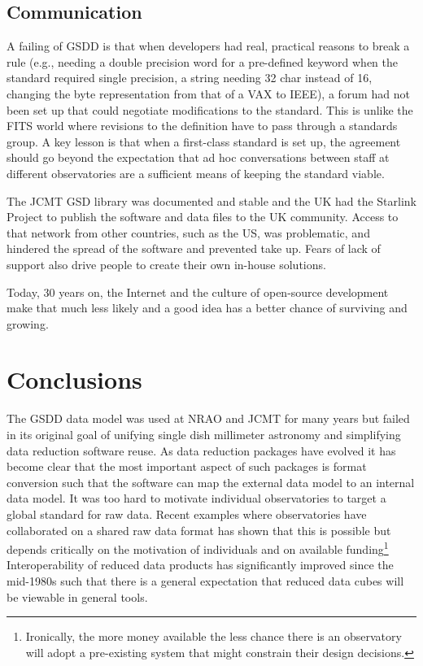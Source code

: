 \documentclass[final,authoryear,5p,times,twocolumn]{elsarticle}
\begin{document}
\subsection{Communication}

A failing of GSDD is that when developers had real, practical reasons
to break a rule (e.g., needing a double precision word for a
pre-defined keyword when the standard required single precision, a
string needing 32 char instead of 16, changing the byte representation
from that of a VAX to IEEE), a forum had not been set up that could
negotiate modifications to the standard.  This is unlike the FITS
world where revisions to the definition have to pass through a
standards group.  A key lesson is that when a first-class standard is
set up, the agreement should go beyond the expectation that ad hoc
conversations between staff at different observatories are a
sufficient means of keeping the standard viable.

The JCMT GSD library was documented and stable and the UK had the
Starlink Project \citep{1982QJRAS..23..485D} to publish the software
and data files to the UK community. Access to that network from other
countries, such as the US, was problematic, and hindered the spread of
the software and prevented take up. Fears of lack of support also
drive people to create their own in-house solutions.

Today, 30 years on, the Internet and the culture of open-source
development make that much less likely and a good idea has a better
chance of surviving and growing.

\section{Conclusions}

The GSDD data model was used at NRAO and JCMT for many years
but failed in its original goal of unifying single dish millimeter
astronomy and simplifying data reduction software reuse. As data
reduction packages have evolved it has become clear that the most
important aspect of such packages is format conversion such that the
software can map the external data model to an internal data model. It
was too hard to motivate individual observatories to target a
global standard for raw data. Recent examples where observatories have
collaborated on a shared raw data format
\citep[e.g. MBFITS;][]{2006A&A...454L..25M} has shown that this is
possible but depends critically on the motivation of individuals and
on available funding\footnote{Ironically, the more money available the
  less chance there is an observatory will adopt a pre-existing system
  that might constrain their design decisions.}
 Interoperability of reduced data
products has significantly improved since the mid-1980s such that
there is a general expectation that reduced data cubes will be
viewable in general tools.
\end{document}
